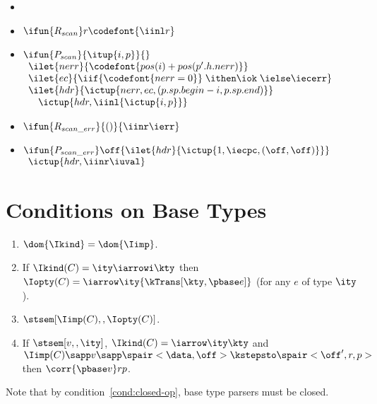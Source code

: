 \begin{itemize}
\item %
\item $\ifun{R_{scan}} r  {\codefont{\iinl r}}$
\item $\ifun{P_{scan}} {\itup{i,p}} {}$ \\
$\begin{array}{l}
\ilet {nerr} {\codefont{pos(i) + pos(p'.h.nerr)}}\\
\ilet {ec} {\iif {\codefont{nerr = 0}}\; \ithen \iok\; \ielse \iecerr} \\
\ilet {hdr} {\ictup{nerr,ec,(p.sp.begin - i,p.sp.end)}} \\
\quad \ictup{hdr,\iinl {\ictup{i,p}}}
\end{array}$

\item $\ifun {R_{scan\_err}} {()} {\iinr \ierr}$
\item $\ifun {P_{scan\_err}} \off {\ilet {hdr} {\ictup{1,\iecpc,(\off,\off)}}}$\\
  \verb+ +$\ictup{hdr,\iinr \iuval}$
\end{itemize}


\section{Conditions on Base Types}
\label{app:meta-theory}
\begin{condition}
\label{cond:base-types}
  \begin{enumerate}
  \item $\dom {\Ikind} = \dom {\Iimp}$.
  \item If $\Ikind(C) = {\ity \iarrowi \kty}$ then $\Iopty(C) =
    \iarrow \ity {\kTrans[\kty,\pbase e]}$ (for any $e$ of type $\ity$).
  \item $\stsem[\Iimp(C),,\Iopty(C)]$.
    \label{cond:closed-op}
  \item If $\stsem[v,,\ity]$, $\Ikind(C) = \iarrow \ity \kty$ and
    $\Iimp(C) \sapp v \sapp \spair<\data,\off> \kstepsto \spair<\off',r,p>$
    then $\corr {\pbase v} r p $.
  \end{enumerate}
\end{condition}
\noindent
Note that by condition~\ref{cond:closed-op}, base type parsers must
be closed.

